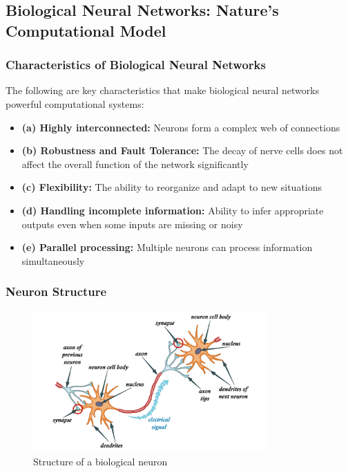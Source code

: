 \subsection{Biological Neural Networks: Nature's Computational Model}

\subsubsection{Characteristics of Biological Neural Networks}

The following are key characteristics that make biological neural networks powerful computational systems:

\begin{itemize}
\item \textbf{(a) Highly interconnected:} Neurons form a complex web of connections
\item \textbf{(b) Robustness and Fault Tolerance:} The decay of nerve cells does not affect the overall function of the network significantly
\item \textbf{(c) Flexibility:} The ability to reorganize and adapt to new situations
\item \textbf{(d) Handling incomplete information:} Ability to infer appropriate outputs even when some inputs are missing or noisy
\item \textbf{(e) Parallel processing:} Multiple neurons can process information simultaneously
\end{itemize}

\subsubsection{Neuron Structure}

\begin{figure}[h!]
\centering
\includegraphics[width=0.8\textwidth]{figures/biological_neuron.png}
\caption{Structure of a biological neuron}
\end{figure}

